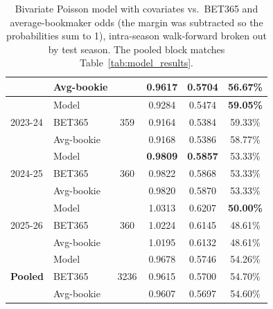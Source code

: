 \documentclass{article}
\begin{document}
\begin{table}[H]
\begin{tabular}{llcccc}
                          & Avg-bookie &                       & 0.9617 & 0.5704 & 56.67\% \\
\midrule
\multirow{3}{*}{2023-24} & Model      & \multirow{3}{*}{359} & 0.9284 & 0.5474 & \textbf{59.05\%} \\
                          & BET365     &                       & 0.9164 & 0.5384 & 59.33\% \\
                          & Avg-bookie &                       & 0.9168 & 0.5386 & 58.77\% \\
\midrule
\multirow{3}{*}{2024-25} & Model      & \multirow{3}{*}{360} & \textbf{0.9809} & \textbf{0.5857} & 53.33\% \\
                          & BET365     &                       & 0.9822 & 0.5868 & 53.33\% \\
                          & Avg-bookie &                       & 0.9820 & 0.5870 & 53.33\% \\
\midrule
\multirow{3}{*}{2025-26} & Model      & \multirow{3}{*}{360} & 1.0313 & 0.6207 & \textbf{50.00\%} \\
                          & BET365     &                       & 1.0224 & 0.6145 & 48.61\% \\
                          & Avg-bookie &                       & 1.0195 & 0.6132 & 48.61\% \\
\midrule
\multirow{3}{*}{\textbf{Pooled}} & Model      & \multirow{3}{*}{3236} & 0.9678 & 0.5746 & 54.26\% \\
                                  & BET365     &                        & 0.9615 & 0.5700 & 54.70\% \\
                                  & Avg-bookie &                        & 0.9607 & 0.5697 & 54.60\% \\
\bottomrule
\end{tabular}
\caption{Bivariate Poisson model with covariates vs.\ BET365 and average-bookmaker odds (the margin was subtracted so the probabilities sum to 1), intra-season walk-forward broken out by test season. The pooled block matches Table~\ref{tab:model_results}.}
\label{tab:bivariate_per_season}
\end{table}
\end{document}
